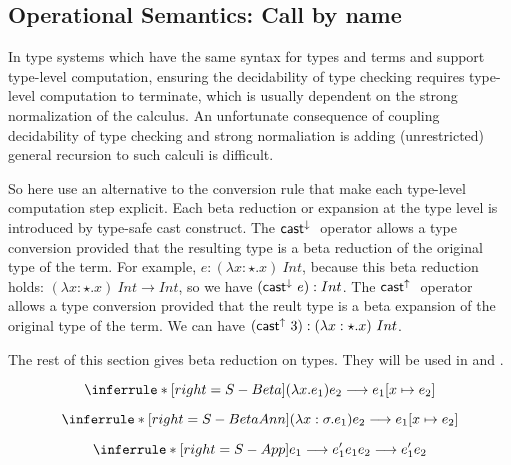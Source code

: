 \gram{ \ottt\ottinterrule}






\subsection{Operational Semantics: Call by name}

In type systems which have the same syntax for types and terms and support type-level computation, ensuring the decidability of type checking requires type-level computation to terminate, which is usually dependent on the strong normalization of the calculus. An unfortunate consequence of coupling decidability of type checking and strong normaliation is adding (unrestricted) general recursion to such calculi is difficult.

So here use an alternative to the conversion rule that make each type-level computation step explicit. Each beta reduction or expansion at the type level is introduced by type-safe cast construct. The $\mathsf{cast}^{\downarrow}\ $ operator allows a type conversion provided that the resulting type is a beta reduction of the original type of the term. For example, $e: (\lambda x:\star. x)\ Int$, because this beta reduction holds: $(\lambda x:\star. x)\ Int \longrightarrow Int$, so we have $(\mathsf{cast}^{\downarrow}\  e) : Int$. The $\mathsf{cast}^{\uparrow}\ $ operator allows a type conversion provided that the reult type is a beta expansion of the original type of the term. We can have $(\mathsf{cast}^{\uparrow}\  3):(\lambda x:\star. x)\ Int$.

The rest of this section gives beta reduction on types. They will be used in \castupe and \castdowne.

\[
\inferrule*[right=S-Beta]
{  }
{ (\lambda x. e_1) e_2 \longrightarrow e_1 [x\mapsto e_2] }
\]

\[
\inferrule*[right=S-BetaAnn]
{  }
{ (\lambda x:\sigma. e_1) e_2 \longrightarrow e_1 [x\mapsto e_2] }
\]

\[
\inferrule*[right=S-App]
{ e_1 \longrightarrow e_1'  }
{ e_1 e_2 \longrightarrow e_1' e_2}
\]

